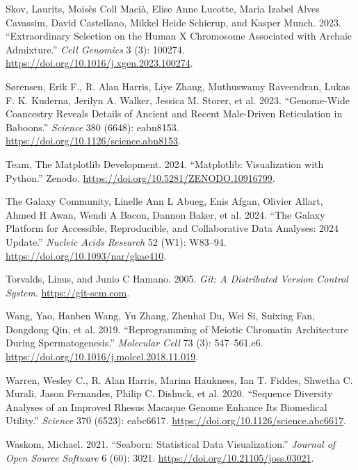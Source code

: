 \documentclass[
  11pt,
  a4paper,
]{scrbook}
\newlength{\cslhangindent}
\newenvironment{CSLReferences}[2] %
 {\begin{list}{}{%
  \setlength{\itemindent}{0pt}
  \setlength{\leftmargin}{0pt}
  \setlength{\parsep}{0pt}
  \ifodd #1
   \setlength{\leftmargin}{\cslhangindent}
   \setlength{\itemindent}{-1\cslhangindent}
  \fi
  \setlength{\itemsep}{#2\baselineskip}}}
 {\end{list}}
\begin{document}
\begin{CSLReferences}{1}{0}
Skov, Laurits, Moisès Coll Macià, Elise Anne Lucotte, Maria Izabel Alves
Cavassim, David Castellano, Mikkel Heide Schierup, and Kasper Munch.
2023. {``Extraordinary Selection on the Human {X} Chromosome Associated
with Archaic Admixture.''} \emph{Cell Genomics} 3 (3): 100274.
\url{https://doi.org/10.1016/j.xgen.2023.100274}.

Sørensen, Erik F., R. Alan Harris, Liye Zhang, Muthuswamy Raveendran,
Lukas F. K. Kuderna, Jerilyn A. Walker, Jessica M. Storer, et al. 2023.
{``Genome-Wide Coancestry Reveals Details of Ancient and Recent
Male-Driven Reticulation in Baboons.''} \emph{Science} 380 (6648):
eabn8153. \url{https://doi.org/10.1126/science.abn8153}.

Team, The Matplotlib Development. 2024. {``Matplotlib: {Visualization}
with {Python}.''} Zenodo. \url{https://doi.org/10.5281/ZENODO.10916799}.

The Galaxy Community, Linelle Ann L Abueg, Enis Afgan, Olivier Allart,
Ahmed H Awan, Wendi A Bacon, Dannon Baker, et al. 2024. {``The {Galaxy}
Platform for Accessible, Reproducible, and Collaborative Data Analyses:
2024 Update.''} \emph{Nucleic Acids Research} 52 (W1): W83--94.
\url{https://doi.org/10.1093/nar/gkae410}.

Torvalds, Linus, and Junio C Hamano. 2005. \emph{Git: A Distributed
Version Control System}. \url{https://git-scm.com}.

Wang, Yao, Hanben Wang, Yu Zhang, Zhenhai Du, Wei Si, Suixing Fan,
Dongdong Qin, et al. 2019. {``Reprogramming of {Meiotic Chromatin
Architecture} During {Spermatogenesis}.''} \emph{Molecular Cell} 73 (3):
547--561.e6. \url{https://doi.org/10.1016/j.molcel.2018.11.019}.

Warren, Wesley C., R. Alan Harris, Marina Haukness, Ian T. Fiddes,
Shwetha C. Murali, Jason Fernandes, Philip C. Dishuck, et al. 2020.
{``Sequence Diversity Analyses of an Improved Rhesus Macaque Genome
Enhance Its Biomedical Utility.''} \emph{Science} 370 (6523): eabc6617.
\url{https://doi.org/10.1126/science.abc6617}.

Waskom, Michael. 2021. {``Seaborn: Statistical Data Visualization.''}
\emph{Journal of Open Source Software} 6 (60): 3021.
\url{https://doi.org/10.21105/joss.03021}.


\end{CSLReferences}
\end{document}
